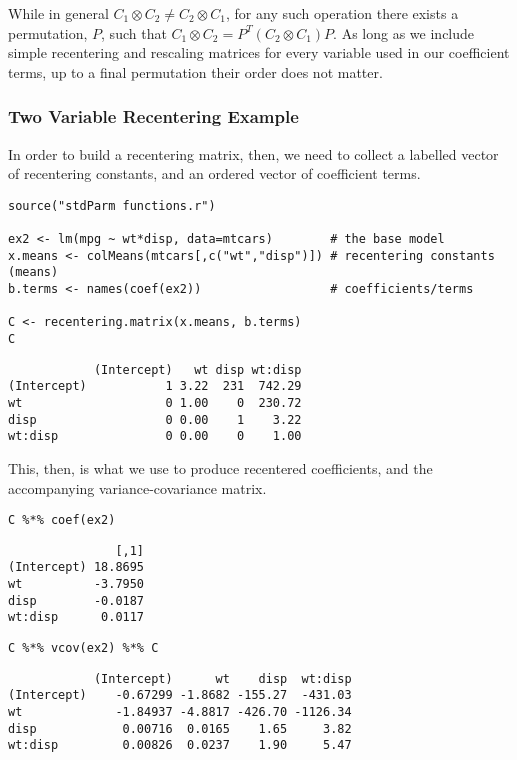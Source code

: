 \documentclass[]{article}
\begin{document}
While in general \(C_1 \otimes C_2 \neq C_2 \otimes C_1\), for any such
operation there exists a permutation, \(P\), such that
\(C_1 \otimes C_2 = P^T(C_2 \otimes C_1)P\). As long as we include
simple recentering and rescaling matrices for every variable used in our
coefficient terms, up to a final permutation their order does not
matter.

\subsubsection{Two Variable Recentering
Example}\label{two-variable-recentering-example}

In order to build a recentering matrix, then, we need to collect a
labelled vector of recentering constants, and an ordered vector of
coefficient terms.

\begin{verbatim}
source("stdParm functions.r")

ex2 <- lm(mpg ~ wt*disp, data=mtcars)        # the base model
x.means <- colMeans(mtcars[,c("wt","disp")]) # recentering constants (means)
b.terms <- names(coef(ex2))                  # coefficients/terms

C <- recentering.matrix(x.means, b.terms)
C
\end{verbatim}

\begin{verbatim}
            (Intercept)   wt disp wt:disp
(Intercept)           1 3.22  231  742.29
wt                    0 1.00    0  230.72
disp                  0 0.00    1    3.22
wt:disp               0 0.00    0    1.00
\end{verbatim}

This, then, is what we use to produce recentered coefficients, and the
accompanying variance-covariance matrix.

\begin{verbatim}
C %*% coef(ex2)
\end{verbatim}

\begin{verbatim}
               [,1]
(Intercept) 18.8695
wt          -3.7950
disp        -0.0187
wt:disp      0.0117
\end{verbatim}

\begin{verbatim}
C %*% vcov(ex2) %*% C
\end{verbatim}

\begin{verbatim}
            (Intercept)      wt    disp  wt:disp
(Intercept)    -0.67299 -1.8682 -155.27  -431.03
wt             -1.84937 -4.8817 -426.70 -1126.34
disp            0.00716  0.0165    1.65     3.82
wt:disp         0.00826  0.0237    1.90     5.47
\end{verbatim}
\end{document}
